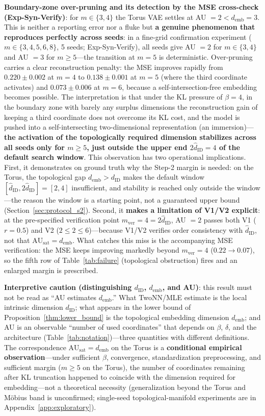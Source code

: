 \documentclass[make,article,submit,pdftex,moreauthors]{Definitions/mdpi}
\newcommand{\dID}{d_{\mathrm{ID}}}
\newcommand{\hatdID}{\hat{d}_{\mathrm{ID}}}
\newcommand{\AUsat}{\mathrm{AU}_{\mathrm{sat}}}
\newcommand{\demb}{d_{\mathrm{emb}}}
\begin{document}
\textbf{Boundary-zone over-pruning and its detection by the MSE
cross-check (Exp-Syn-Verify)}:
for $m \in \{3, 4\}$ the Torus VAE settles at AU $= 2 < \demb = 3$.
This is neither a reporting error nor a fluke but \textbf{a genuine
phenomenon that reproduces perfectly across seeds}: in a fine-grid
confirmation experiment ($m \in \{3, 4, 5, 6, 8\}$, 5 seeds;
Exp-Syn-Verify), all seeds give AU $= 2$ for $m \in \{3, 4\}$ and
AU $= 3$ for $m \geq 5$---the transition at $m = 5$ is deterministic.
Over-pruning carries a clear reconstruction penalty: the MSE improves
rapidly from $0.220 \pm 0.002$ at $m = 4$ to $0.138 \pm 0.001$ at $m = 5$
(where the third coordinate activates) and $0.073 \pm 0.006$ at $m = 6$,
because a self-intersection-free embedding becomes possible.
The interpretation is that under the KL pressure of $\beta = 4$, in the
boundary zone with barely any surplus dimensions the reconstruction gain of
keeping a third coordinate does not overcome its KL cost, and the model is
pushed into a self-intersecting two-dimensional representation (an
immersion)---\textbf{the activation of the topologically required dimension
stabilizes across all seeds only for $m \geq 5$, just outside the upper end
$2\hatdID = 4$ of the default search window}.
This observation has two operational implications.
First, it demonstrates on ground truth why the Step-2 margin is needed: on
the Torus, the topological gap $\demb > \dID$ makes the default window
$[\hatdID, 2\hatdID] = [2, 4]$ insufficient, and stability is reached only
outside the window---the reason the window is a starting point, not a
guaranteed upper bound (Section~\ref{sec:protocol_s2}).
Second, it \textbf{makes a limitation of V1/V2 explicit}: at the
pre-specified verification point $m_{\mathrm{ver}} = 4 = 2\hatdID$, AU
$= 2$ passes both V1 ($r = 0.5$) and V2 ($2 \leq 2 \leq 6$)---because
V1/V2 verifies order consistency with $\hatdID$, not that
$\AUsat = \demb$.
What catches this miss is the accompanying MSE verification: the MSE keeps
improving markedly beyond $m_{\mathrm{ver}} = 4$ ($0.22 \to 0.07$), so the
fifth row of Table~\ref{tab:failure} (topological obstruction) fires and
an enlarged margin is prescribed.

\textbf{Interpretive caution (distinguishing $\dID$, $\demb$, and AU)}:
this result must not be read as ``AU estimates $\demb$.''
What TwoNN/MLE estimate is the local intrinsic dimension $\dID$; what
appears in the lower bound of Proposition~\ref{thm:lower_bound} is the
topological embedding dimension $\demb$; and AU is an observable ``number of
used coordinates'' that depends on $\beta$, $\delta$, and the architecture
(Table~\ref{tab:notation})---three quantities with different definitions.
The correspondence $\AUsat = \demb$ on the Torus is a \textbf{conditional
empirical observation}---under sufficient $\beta$, convergence,
standardization preprocessing, and sufficient margin ($m \geq 5$ on the
Torus), the number of coordinates remaining after KL
truncation happened to coincide with the dimension required for
embedding---not a theoretical necessity
(generalization beyond the Torus and M\"obius band is unconfirmed;
single-seed topological-manifold experiments are in
Appendix~\ref{app:exploratory}).
\end{document}
